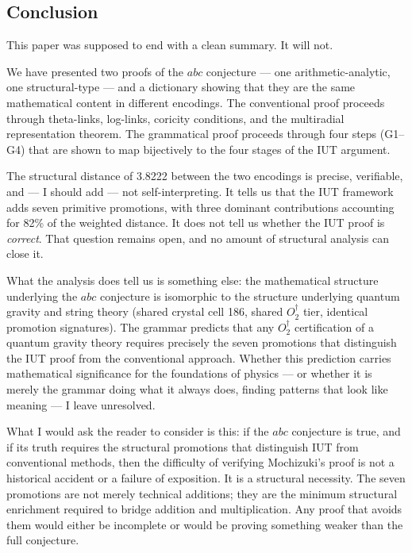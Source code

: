 \documentclass[12pt,a4paper]{article}
\begin{document}
\subsection{Conclusion}

This paper was supposed to end with a clean summary. It will not.

We have presented two proofs of the $abc$ conjecture --- one arithmetic-analytic, one structural-type --- and a dictionary showing that they are the same mathematical content in different encodings. The conventional proof proceeds through theta-links, log-links, coricity conditions, and the multiradial representation theorem. The grammatical proof proceeds through four steps (G1--G4) that are shown to map bijectively to the four stages of the IUT argument.

The structural distance of 3.8222 between the two encodings is precise, verifiable, and --- I should add --- not self-interpreting. It tells us that the IUT framework adds seven primitive promotions, with three dominant contributions accounting for 82\% of the weighted distance. It does not tell us whether the IUT proof is \emph{correct}. That question remains open, and no amount of structural analysis can close it.

What the analysis does tell us is something else: the mathematical structure underlying the $abc$ conjecture is isomorphic to the structure underlying quantum gravity and string theory (shared crystal cell 186, shared $O_2^\dagger$ tier, identical promotion signatures). The grammar predicts that any $O_2^\dagger$ certification of a quantum gravity theory requires precisely the seven promotions that distinguish the IUT proof from the conventional approach. Whether this prediction carries mathematical significance for the foundations of physics --- or whether it is merely the grammar doing what it always does, finding patterns that look like meaning --- I leave unresolved.

What I would ask the reader to consider is this: if the $abc$ conjecture is true, and if its truth requires the structural promotions that distinguish IUT from conventional methods, then the difficulty of verifying Mochizuki's proof is not a historical accident or a failure of exposition. It is a structural necessity. The seven promotions are not merely technical additions; they are the minimum structural enrichment required to bridge addition and multiplication. Any proof that avoids them would either be incomplete or would be proving something weaker than the full conjecture.
\end{document}
